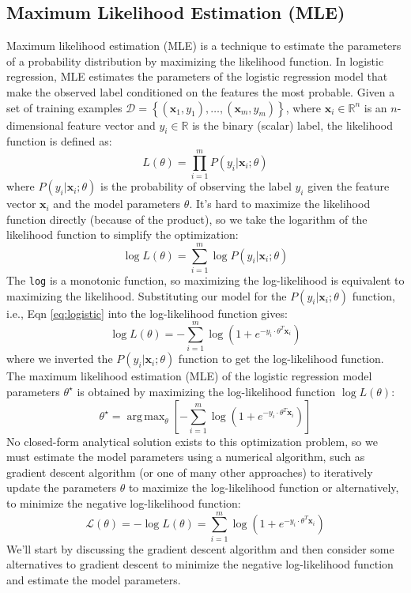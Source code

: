 \documentclass{article}[11pt]
\DeclareMathOperator*{\argmax}{arg\,max}
\begin{document}
\subsection{Maximum Likelihood Estimation (MLE)}
Maximum likelihood estimation (MLE) is a technique to estimate the parameters of a probability distribution by maximizing the likelihood function.
In logistic regression, MLE estimates the parameters of the logistic regression model that make the observed label conditioned on the features the most probable.
Given a set of training examples $\mathcal{D} = \left\{\left(\mathbf{x}_{1}, y_{1}\right),\dots,\left(\mathbf{x}_{m}, y_{m}\right)\right\}$, where $\mathbf{x}_{i}\in\mathbb{R}^{n}$ is an $n$-dimensional feature vector and $y_{i}\in\mathbb{R}$ is the binary (scalar) label, the likelihood function is defined as:
\begin{equation}
L(\theta) = \prod_{i=1}^{m}P(y_{i}|\mathbf{x}_{i};\theta)
\end{equation}
where $P(y_{i}|\mathbf{x}_{i};\theta)$ is the probability of observing the label $y_{i}$ given the feature vector $\mathbf{x}_{i}$ and the model parameters $\theta$.
It's hard to maximize the likelihood function directly (because of the product), so we take the logarithm of the likelihood function to simplify the optimization:
\begin{equation}
\log{L}(\theta) = \sum_{i=1}^{m}\log P(y_{i}|\mathbf{x}_{i};\theta)
\end{equation}
The \texttt{log} is a monotonic function, so maximizing the log-likelihood is equivalent to maximizing the likelihood.
Substituting our model for the $P(y_{i}|\mathbf{x}_{i};\theta)$ function, i.e., Eqn \eqref{eq:logistic} into the log-likelihood function gives:
\begin{equation}
\log{L}(\theta) = -\sum_{i=1}^{m}\log\left(1 + e^{-y_{i}\cdot\theta^{T}\mathbf{x}_{i}}\right)
\end{equation}
where we inverted the $P(y_{i}|\mathbf{x}_{i};\theta)$ function to get the log-likelihood function.
The maximum likelihood estimation (MLE) of the logistic regression model parameters $\theta^{\star}$ is obtained by maximizing the log-likelihood function
$\log{L}(\theta)$:
\begin{equation}
\theta^{\star} = \argmax_{\theta}\left[-\sum_{i=1}^{m}\log\left(1 + e^{-y_{i}\cdot\theta^{T}\mathbf{x}_{i}}\right)\right]
\end{equation}
No closed-form analytical solution exists to this optimization problem, so we must estimate the model parameters using a numerical algorithm, 
such as gradient descent algorithm (or one of many other approaches) to iteratively update the parameters $\theta$ to maximize the log-likelihood function 
or alternatively, to minimize the negative log-likelihood function:
\begin{equation}
\mathcal{L}(\theta) =-\log{L}(\theta) = \sum_{i=1}^{m}\log\left(1 + e^{-y_{i}\cdot\theta^{T}\mathbf{x}_{i}}\right)
\end{equation}
We'll start by discussing the gradient descent algorithm and then consider some alternatives to gradient descent to 
minimize the negative log-likelihood function and estimate the model parameters.
\end{document}
